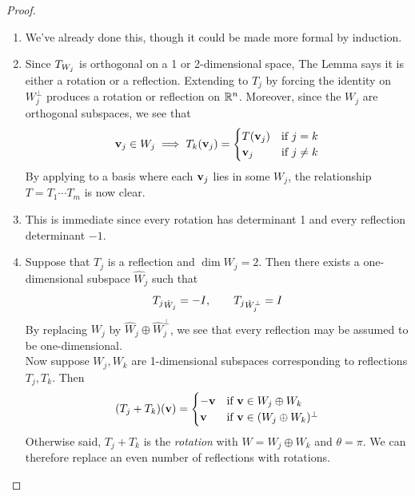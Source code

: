 \begin{proof}
\begin{enumerate}
  \item We've already done this, though it could be made more formal by induction.
  \item Since $T_{W_j}$ is orthogonal on a 1 or 2-dimensional space, The Lemma says it is either a rotation or a reflection. Extending to $T_j$ by forcing the identity on $W_j^\perp$ produces a rotation or reflection on $\mathbb{R}^n$. Moreover, since the $W_j$ are orthogonal subspaces, we see that
  \[{\mathbf{v}}_j\in W_j\implies T_k({\mathbf{v}}_j)=\begin{cases}
  T({\mathbf{v}}_j)&\text{if $j=k$}\\
  {\mathbf{v}}_j&\text{if $j\neq k$}
  \end{cases}\]
  By applying to a basis where each ${\mathbf{v}}_j$ lies in some $W_j$, the relationship $T=T_1\cdots T_m$ is now clear.
  \item This is immediate since every rotation has determinant 1 and every reflection determinant $-1$.
  \item Suppose that $T_j$ is a reflection and $\dim W_j=2$. Then there exists a one-dimensional subspace $\hat W_j$ such that
  \[{T_j}_{{\hat W_j}}=-I,\qquad {T_j}_{{\hat W_j^\perp}}=I\]
  By replacing $W_j$ by $\hat W_j\oplus \hat W_j^\perp$, we see that every reflection may be assumed to be one-dimensional.\\
  Now suppose $W_j,W_k$ are 1-dimensional subspaces corresponding to reflections $T_j,T_k$. Then
  \[(T_j+T_k)({\mathbf{v}})=\begin{cases}
  -{\mathbf{v}}&\text{if ${\mathbf{v}}\in W_j\oplus W_k$}\\
  {\mathbf{v}}&\text{if ${\mathbf{v}}\in (W_j\oplus W_k)^\perp$}
  \end{cases}\]
  Otherwise said, $T_j+T_k$ is the \emph{rotation} with $W=W_j\oplus W_k$ and $\theta=\pi$. We can therefore replace an even number of reflections with rotations.\qedhere
\end{enumerate}
\end{proof}



